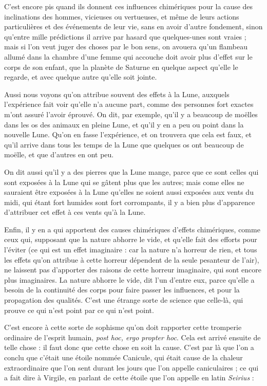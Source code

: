 C'est encore pis quand ils donnent ces influences chimériques pour la cause des inclinations des hommes, vicieuses ou vertueuses, et même de leurs actions particulières et des événements de leur vie, sans en avoir d'autre fondement, sinon qu'entre mille prédictions il arrive par hasard que quelques-unes sont vraies ; mais si l'on veut juger des choses par le bon sens, on avouera qu'un flambeau allumé dans la chambre d'une femme qui accouche doit avoir plus d'effet sur le corps de son enfant, que la planète de Saturne en quelque aspect qu'elle le regarde, et avec quelque autre qu'elle soit jointe.

Aussi nous voyons qu'on attribue souvent des effets à la Lune, auxquels l'expérience fait voir qu'elle n'a aucune part, comme des personnes fort exactes m'ont assuré l'avoir éprouvé. On dit, par exemple, qu'il y a beaucoup de moëlles dans les os des animaux en pleine Lune, et qu'il y en a peu ou point dans la nouvelle Lune. Qu'on en fasse l'expérience, et on trouvera que cela est faux, et qu'il arrive dans tous les temps de la Lune que quelques os ont beaucoup de moëlle, et que d'autres en ont peu.

On dit aussi qu'il y a des pierres que la Lune mange, parce que ce sont celles qui sont exposées à la Lune qui se gâtent plus que les autres; mais come elles ne sauraient être exposées à la Lune qu'elles ne soient aussi exposées aux vents du midi, qui étant fort humides sont fort corrompants, il y a bien plus d'apparence d'attribuer cet effet à ces vents qu'à la Lune.

Enfin, il y en a qui apportent des causes chimériques d'effets chimériques, comme ceux qui, supposant que la nature abhorre le vide, et qu'elle fait des efforts pour l'éviter (ce qui est un effet imaginaire : car la nature n'a horreur de rien, et tous les effets qu'on attribue à cette horreur dépendent de la seule pesanteur de l'air), ne laissent pas d'apporter des raisons de cette horreur imaginaire, qui sont encore plus imaginaires. La nature abhorre le vide, dit l'un d'entre eux, parce qu'elle a besoin de la continuité des corps pour faire passer les influences, et pour la propagation des qualités. C'est une étrange sorte de science que celle-là, qui prouve ce qui n'est point par ce qui n'est point.

C'est encore à cette sorte de sophisme qu'on doit rapporter cette tromperie ordinaire de l'esprit humain, \emph{post hoc, ergo propter hoc}. Cela est arrivé ensuite de telle chose : il faut donc que cette chose en soit la cause. C'est par là que l'on a conclu que c'était une étoile nommée Canicule, qui était cause de la chaleur extraordinaire que l'on sent durant les jours que l'on appelle caniculaires ; ce qui a fait dire à Virgile, en parlant de cette étoile que l'on appelle en latin \emph{Seirius} :

